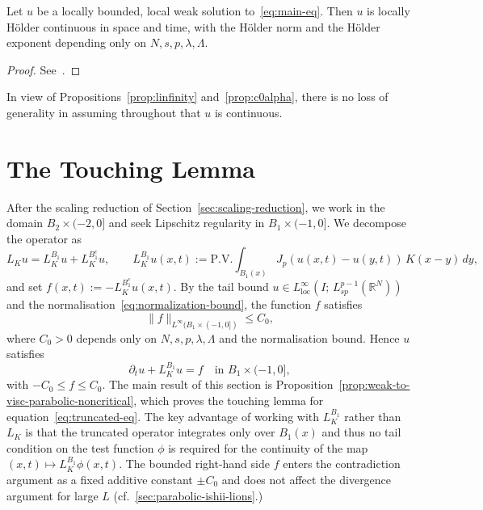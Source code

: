 \documentclass[11pt, a4paper, twoside]{article}
\theoremstyle{definition}
\theoremstyle{remark}
\newcommand{\R}{\mathbb{R}}
\begin{document}
\begin{proposition}
\label{prop:c0alpha}
  Let $u$ be a locally bounded, local weak solution
  to~\eqref{eq:main-eq}. Then $u$ is locally H\"{o}lder
  continuous in space and time, with the H\"older norm and the H\"older exponent depending
  only on $N, s, p, \lambda, \Lambda$.
\end{proposition}
\begin{proof}
  See~\cite{AdimurthiPrasadTewary2025LocalHolder,
  Liao2024HolderParabolicFracPLap}.
\end{proof}

In view of Propositions~\ref{prop:linfinity}
and~\ref{prop:c0alpha}, there is no loss of generality in
assuming throughout that $u$ is continuous. 




\section{The Touching Lemma}
\label{sec:touching}

After the scaling reduction of
Section~\ref{sec:scaling-reduction}, we work in the domain
$B_2 \times (-2,0]$ and seek Lipschitz regularity in
$B_1 \times (-1,0]$. We decompose the operator as
\begin{equation}\label{eq:operator-split}
  L_K u = L_K^{B_1} u + L_K^{B_1^c} u,
  \qquad
  L_K^{B_1} u(x,t)
  := \mathrm{P.V.}\int_{B_1(x)}
     J_p(u(x,t)-u(y,t))\,K(x-y)\,dy,
\end{equation}
and set $f(x,t) := - L_K^{B_1^c} u(x,t)$. By the tail
bound $u \in L^\infty_{\mathrm{loc}}(I;\,L^{p-1}_{sp}(\R^N))$
and the normalisation~\eqref{eq:normalization-bound}, the
function $f$ satisfies
\begin{equation}\label{eq:f-bound}
  \|f\|_{L^\infty(B_1 \times (-1,0])} \le C_0,
\end{equation}
where $C_0 > 0$ depends only on $N,s,p,\lambda,\Lambda$
and the normalisation bound. Hence $u$ satisfies
\begin{equation}\label{eq:truncated-eq}
  \partial_t u + L_K^{B_1} u = f
  \quad \text{in } B_1 \times (-1,0],
\end{equation}
with $-C_0 \le f \le C_0$. The main result of this
section is
Proposition~\ref{prop:weak-to-visc-parabolic-noncritical},
which proves the touching lemma for
equation~\eqref{eq:truncated-eq}. The key advantage of
working with $L_K^{B_1}$ rather than $L_K$ is that the
truncated operator integrates only over $B_1(x)$ and thus no tail
condition on the test function $\phi$ is required for the
continuity of the map $(x,t) \mapsto L_K^{B_1}\phi(x,t)$. The bounded
right-hand side $f$ enters the contradiction argument
as a fixed additive constant $\pm C_0$ and does not
affect the divergence argument for large $L$ (cf.~\cref{sec:parabolic-ishii-lions}.)
\end{document}
